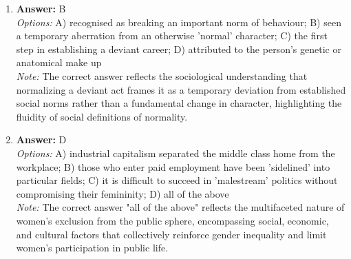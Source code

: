 \documentclass[12pt]{article}
\begin{document}
\begin{enumerate}[label=\arabic*.]
\item \textbf{Answer:} B
\\ \textit{Options:} A) recognised as breaking an important norm of behaviour; B) seen a temporary aberration from an otherwise 'normal' character; C) the first step in establishing a deviant career; D) attributed to the person's genetic or anatomical make up
\\ \textit{Note:} The correct answer reflects the sociological understanding that normalizing a deviant act frames it as a temporary deviation from established social norms rather than a fundamental change in character, highlighting the fluidity of social definitions of normality.
\item \textbf{Answer:} D
\\ \textit{Options:} A) industrial capitalism separated the middle class home from the workplace; B) those who enter paid employment have been 'sidelined' into particular fields; C) it is difficult to succeed in 'malestream' politics without compromising their femininity; D) all of the above
\\ \textit{Note:} The correct answer "all of the above" reflects the multifaceted nature of women's exclusion from the public sphere, encompassing social, economic, and cultural factors that collectively reinforce gender inequality and limit women's participation in public life.
\end{enumerate}
\end{document}
